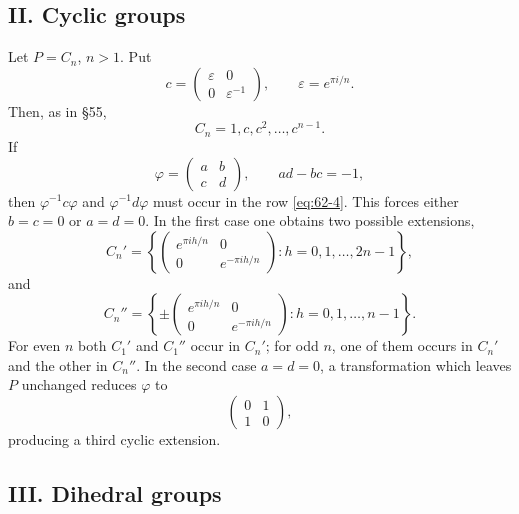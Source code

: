 \documentclass[11pt]{article}
\newcommand{\eps}{\varepsilon}
\begin{document}
\subsection*{II. Cyclic groups}

Let \(P=C_n\), \(n>1\).  Put
\begin{equation}\label{eq:62-3}
 c=\begin{pmatrix}\eps&0\\0&\eps^{-1}\end{pmatrix},
 \qquad \eps=e^{\pi i/n}.
\end{equation}
Then, as in \S 55,
\begin{equation}\label{eq:62-4}
 C_n=1,c,c^2,\ldots,c^{n-1}.
\end{equation}
If
\begin{equation}\label{eq:62-5}
 \varphi=\begin{pmatrix}a&b\\c&d\end{pmatrix},
 \qquad ad-bc=-1,
\end{equation}
then \(\varphi^{-1}c\varphi\) and \(\varphi^{-1}d\varphi\) must occur in the row \eqref{eq:62-4}.  This forces either \(b=c=0\) or \(a=d=0\).  In the first case one obtains two possible extensions,
\begin{equation}\label{eq:62-7}
 C_n'=
 \left\{
 \begin{pmatrix}e^{\pi ih/n}&0\\0&e^{-\pi ih/n}\end{pmatrix}:h=0,1,\ldots,2n-1
 \right\},
\end{equation}
and
\begin{equation}\label{eq:62-8}
 C_n''=
 \left\{
 \pm\begin{pmatrix}e^{\pi ih/n}&0\\0&e^{-\pi ih/n}\end{pmatrix}:h=0,1,\ldots,n-1
 \right\}.
\end{equation}
For even \(n\) both \(C_1'\) and \(C_1''\) occur in \(C_n'\); for odd \(n\), one of them occurs in \(C_n'\) and the other in \(C_n''\).  In the second case \(a=d=0\), a transformation which leaves \(P\) unchanged reduces \(\varphi\) to
\[
 \begin{pmatrix}0&1\\1&0\end{pmatrix},
\]
producing a third cyclic extension.

\subsection*{III. Dihedral groups}
\end{document}
